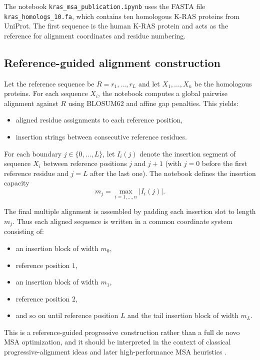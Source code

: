 \documentclass[11pt,a4paper]{article}
\begin{document}
The notebook \texttt{kras\_msa\_publication.ipynb} uses the FASTA file \texttt{kras\_homologs\_10.fa}, which contains ten homologous K-RAS proteins from UniProt. The first sequence is the human K-RAS protein and acts as the reference for alignment coordinates and residue numbering.

\subsection{Reference-guided alignment construction}

Let the reference sequence be $R=r_1,\dots,r_L$ and let $X_1,\dots,X_n$ be the homologous proteins. For each sequence $X_i$, the notebook computes a global pairwise alignment against $R$ using BLOSUM62 and affine gap penalties. This yields:

\begin{itemize}[leftmargin=*]
\item aligned residue assignments to each reference position,
\item insertion strings between consecutive reference residues.
\end{itemize}

For each boundary $j\in\{0,\dots,L\}$, let $I_i(j)$ denote the insertion segment of sequence $X_i$ between reference positions $j$ and $j+1$ (with $j=0$ before the first reference residue and $j=L$ after the last one). The notebook defines the insertion capacity
\[
m_j=\max_{i=1,\dots,n}|I_i(j)|.
\]

The final multiple alignment is assembled by padding each insertion slot to length $m_j$. Thus each aligned sequence is written in a common coordinate system consisting of:

\begin{itemize}[leftmargin=*]
\item an insertion block of width $m_0$,
\item reference position $1$,
\item an insertion block of width $m_1$,
\item reference position $2$,
\item and so on until reference position $L$ and the tail insertion block of width $m_L$.
\end{itemize}

This is a reference-guided progressive construction rather than a full de novo MSA optimization, and it should be interpreted in the context of classical progressive-alignment ideas and later high-performance MSA heuristics \cite{Feng1987,Edgar2004}.
\end{document}
